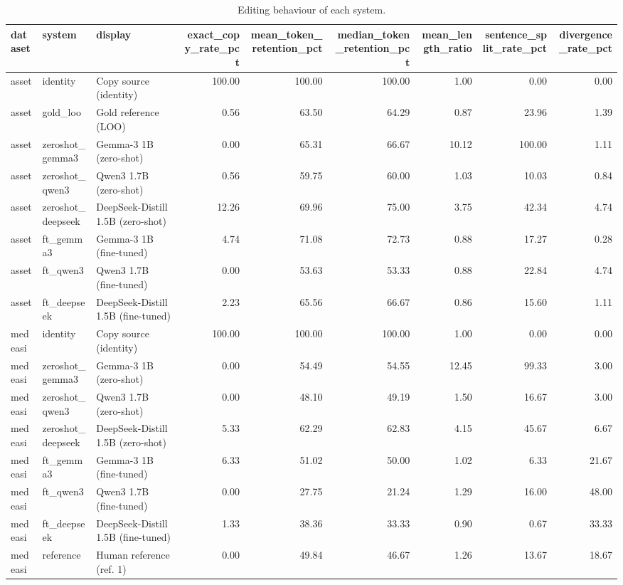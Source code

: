\begin{table}
\caption{Editing behaviour of each system.}
\label{tab:behaviour}
\begin{tabular}{lllrrrrrr}
\toprule
dataset & system & display & exact_copy_rate_pct & mean_token_retention_pct & median_token_retention_pct & mean_length_ratio & sentence_split_rate_pct & divergence_rate_pct \\
\midrule
asset & identity & Copy source (identity) & 100.00 & 100.00 & 100.00 & 1.00 & 0.00 & 0.00 \\
asset & gold_loo & Gold reference (LOO) & 0.56 & 63.50 & 64.29 & 0.87 & 23.96 & 1.39 \\
asset & zeroshot_gemma3 & Gemma-3 1B (zero-shot) & 0.00 & 65.31 & 66.67 & 10.12 & 100.00 & 1.11 \\
asset & zeroshot_qwen3 & Qwen3 1.7B (zero-shot) & 0.56 & 59.75 & 60.00 & 1.03 & 10.03 & 0.84 \\
asset & zeroshot_deepseek & DeepSeek-Distill 1.5B (zero-shot) & 12.26 & 69.96 & 75.00 & 3.75 & 42.34 & 4.74 \\
asset & ft_gemma3 & Gemma-3 1B (fine-tuned) & 4.74 & 71.08 & 72.73 & 0.88 & 17.27 & 0.28 \\
asset & ft_qwen3 & Qwen3 1.7B (fine-tuned) & 0.00 & 53.63 & 53.33 & 0.88 & 22.84 & 4.74 \\
asset & ft_deepseek & DeepSeek-Distill 1.5B (fine-tuned) & 2.23 & 65.56 & 66.67 & 0.86 & 15.60 & 1.11 \\
medeasi & identity & Copy source (identity) & 100.00 & 100.00 & 100.00 & 1.00 & 0.00 & 0.00 \\
medeasi & zeroshot_gemma3 & Gemma-3 1B (zero-shot) & 0.00 & 54.49 & 54.55 & 12.45 & 99.33 & 3.00 \\
medeasi & zeroshot_qwen3 & Qwen3 1.7B (zero-shot) & 0.00 & 48.10 & 49.19 & 1.50 & 16.67 & 3.00 \\
medeasi & zeroshot_deepseek & DeepSeek-Distill 1.5B (zero-shot) & 5.33 & 62.29 & 62.83 & 4.15 & 45.67 & 6.67 \\
medeasi & ft_gemma3 & Gemma-3 1B (fine-tuned) & 6.33 & 51.02 & 50.00 & 1.02 & 6.33 & 21.67 \\
medeasi & ft_qwen3 & Qwen3 1.7B (fine-tuned) & 0.00 & 27.75 & 21.24 & 1.29 & 16.00 & 48.00 \\
medeasi & ft_deepseek & DeepSeek-Distill 1.5B (fine-tuned) & 1.33 & 38.36 & 33.33 & 0.90 & 0.67 & 33.33 \\
medeasi & reference & Human reference (ref. 1) & 0.00 & 49.84 & 46.67 & 1.26 & 13.67 & 18.67 \\
\bottomrule
\end{tabular}
\end{table}
